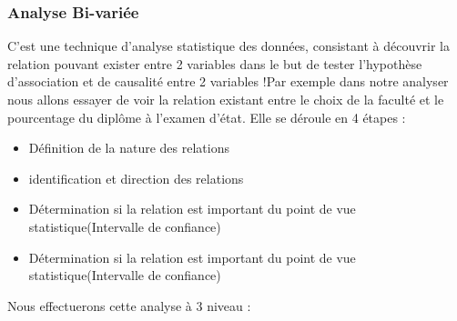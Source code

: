 \subsubsection{Analyse Bi-variée}
C'est une technique d'analyse statistique des données, consistant à
découvrir la relation pouvant exister entre 2 variables dans le but de
tester l'hypothèse d'association et de causalité entre 2 variables !Par
exemple dans notre analyser nous allons essayer de voir la relation
existant entre le choix de la faculté et le pourcentage du diplôme à l'examen d'état. Elle se déroule en 4 étapes : \cite{becker2011uncertainty}
\begin{itemize}
	\item Définition de la nature des relations
	\item  identification et direction des relations 
	\item   Détermination si
	la relation est important du point de vue statistique(Intervalle de
	confiance)
	\item  Détermination si
	la relation est important du point de vue statistique(Intervalle de
	confiance)
\end{itemize}
Nous effectuerons cette analyse à 3 niveau :
